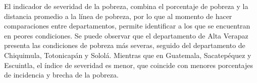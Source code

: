 El indicador de severidad de la pobreza, combina el porcentaje de pobreza y la distancia promedio a la línea de pobreza, por lo que al momento de hacer comparaciones entre departamentos, permite identificar a los que se encuentran en peores condiciones.  Se puede observar que el departamento de Alta Verapaz presenta las condiciones de pobreza más severas, seguido del departamento de Chiquimula, Totonicapán y Sololá. Mientras que en Guatemala, Sacatepéquez y Escuintla, el índice de severidad es menor, que coincide con menores porcentajes de incidencia y brecha de la pobreza. 